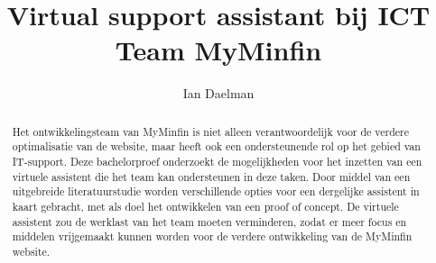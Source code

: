 \documentclass{hogent-article}
\title{Virtual support assistant bij ICT Team MyMinfin}
\author{Ian Daelman}
\begin{document}
\begin{abstract}
   
  Het ontwikkelingsteam van MyMinfin is niet alleen verantwoordelijk voor de verdere optimalisatie van de website, maar heeft ook een ondersteunende rol op het gebied van IT-support. Deze bachelorproef onderzoekt de mogelijkheden voor het inzetten van een virtuele assistent die het team kan ondersteunen in deze taken. Door middel van een uitgebreide literatuurstudie worden verschillende opties voor een dergelijke assistent in kaart gebracht, met als doel het ontwikkelen van een proof of concept. De virtuele assistent zou de werklast van het team moeten verminderen, zodat er meer focus en middelen vrijgemaakt kunnen worden voor de verdere ontwikkeling van de MyMinfin website.
  
 
\end{abstract}

\tableofcontents



\printbibliography[heading=bibintoc]
\end{document}
